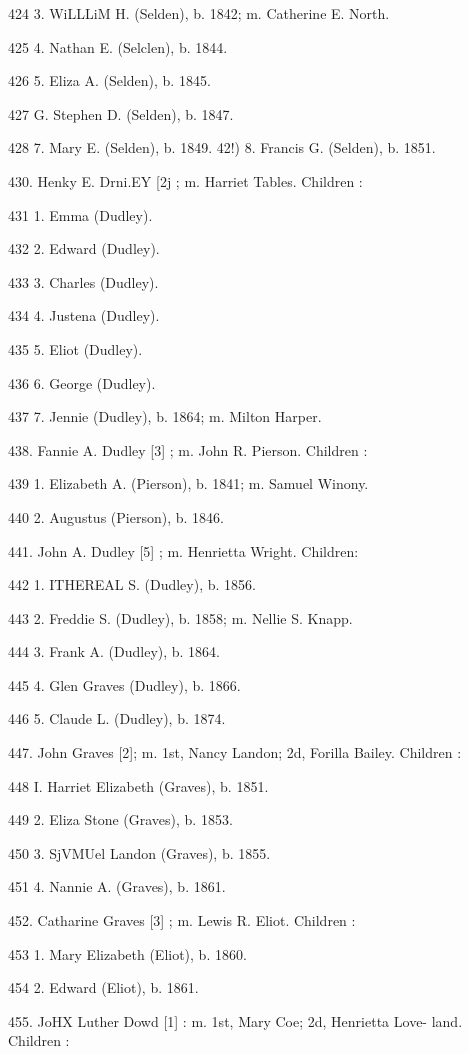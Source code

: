 424 3. WiLLLiM H. (Selden), b. 1842; m. Catherine E. North. 

425 4. Nathan E. (Selclen), b. 1844. 

426 5. Eliza A. (Selden), b. 1845. 

427 G. Stephen D. (Selden), b. 1847. 

428 7. Mary E. (Selden), b. 1849. 
42!) 8. Francis G. (Selden), b. 1851. 

430. Henky E. Drni.EY [2j ; m. Harriet Tables. Children : 

431 1. Emma (Dudley). 

432 2. Edward (Dudley). 

433 3. Charles (Dudley). 

434 4. Justena (Dudley). 

435 5. Eliot (Dudley). 

436 6. George (Dudley). 

437 7. Jennie (Dudley), b. 1864; m. Milton Harper. 

438. Fannie A. Dudley [3] ; m. John R. Pierson. Children : 

439 1. Elizabeth A. (Pierson), b. 1841; m. Samuel Winony. 

440 2. Augustus (Pierson), b. 1846. 

441. John A. Dudley [5] ; m. Henrietta Wright. Children: 

442 1. ITHEREAL S. (Dudley), b. 1856. 

443 2. Freddie S. (Dudley), b. 1858; m. Nellie S. Knapp. 

444 3. Frank A. (Dudley), b. 1864. 

445 4. Glen Graves (Dudley), b. 1866. 

446 5. Claude L. (Dudley), b. 1874. 

447. John Graves [2]; m. 1st, Nancy Landon; 2d, Forilla Bailey. 
Children : 

448 I. Harriet Elizabeth (Graves), b. 1851. 

449 2. Eliza Stone (Graves), b. 1853. 

450 3. SjVMUel Landon (Graves), b. 1855. 

451 4. Nannie A. (Graves), b. 1861. 

452. Catharine Graves [3] ; m. Lewis R. Eliot. Children : 

453 1. Mary Elizabeth (Eliot), b. 1860. 

454 2. Edward (Eliot), b. 1861. 

455. JoHX Luther Dowd [1] : m. 1st, Mary Coe; 2d, Henrietta Love- 
land. Children : 

